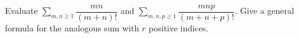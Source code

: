 Evaluate $\sum_{m,n\ge1} \dfrac{m n}{(m+n) !}$ and $\sum_{m,n,p\ge1} \dfrac{m n p}{(m+n+p) !}$. Give a general formula for the analogous sum with $r$ positive indices.
